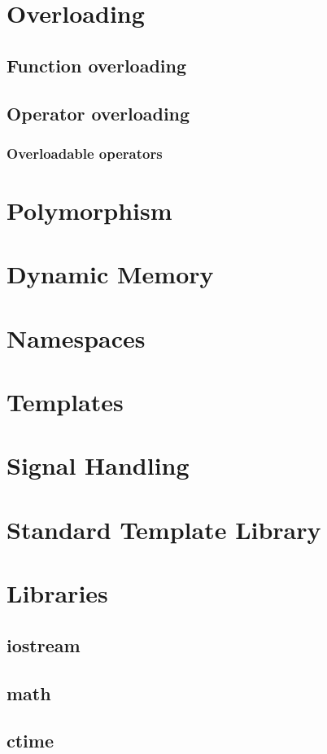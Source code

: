 \documentclass[10pt,a4paper]{scrartcl}
\begin{document}
\begin{multicols*}{2}
\section{Overloading}

\subsection{Function overloading}

\subsection{Operator overloading}

\subsubsection{Overloadable operators}

\section{Polymorphism}

\section{Dynamic Memory}

\section{Namespaces}

\section{Templates}

\section{Signal Handling}

\section{Standard Template Library}

\section{Libraries}

\subsection{iostream}

\subsection{math}

\subsection{ctime}







\end{multicols*}
\end{document}

